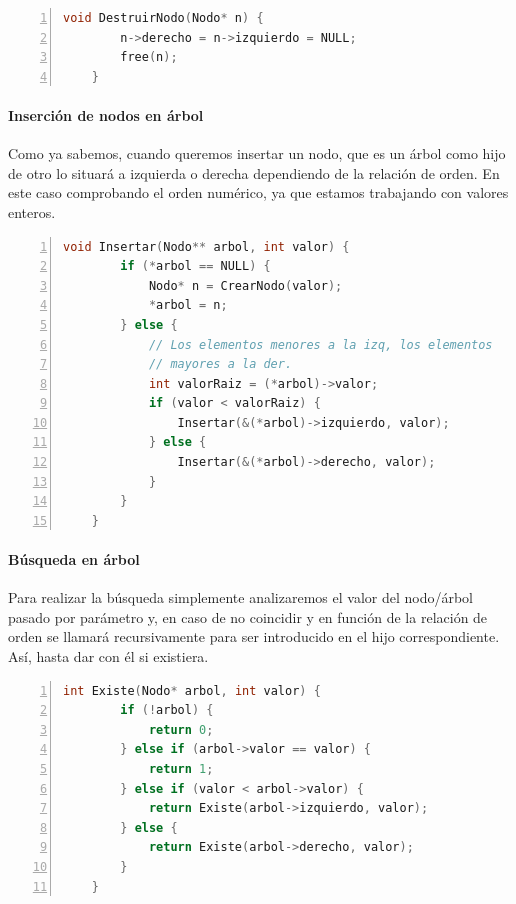 \documentclass[a4paper, 11pt, titlepage]{article}
\begin{document}
            \begin{lstlisting}[language=C,numbers=left]
    void DestruirNodo(Nodo* n) {
        n->derecho = n->izquierdo = NULL;
        free(n);
    }\end{lstlisting}

            \paragraph{Inserción de nodos en árbol} Como ya sabemos, cuando queremos insertar 
            un nodo, que es un árbol como hijo de otro lo situará a izquierda o derecha 
            dependiendo de la relación de orden. En este caso comprobando el orden numérico, 
            ya que estamos trabajando con valores enteros.
            
            \begin{lstlisting}[language=C,numbers=left]
    void Insertar(Nodo** arbol, int valor) {
        if (*arbol == NULL) {
            Nodo* n = CrearNodo(valor);
            *arbol = n;
        } else {
            // Los elementos menores a la izq, los elementos
            // mayores a la der.
            int valorRaiz = (*arbol)->valor;
            if (valor < valorRaiz) {
                Insertar(&(*arbol)->izquierdo, valor);
            } else {
                Insertar(&(*arbol)->derecho, valor);
            }
        }
    }\end{lstlisting}

            \paragraph{Búsqueda en árbol} Para realizar la búsqueda simplemente analizaremos 
            el valor del nodo/árbol pasado por parámetro y, en caso de no coincidir y en 
            función de la relación de orden se llamará recursivamente para ser introducido en 
            el hijo correspondiente. Así, hasta dar con él si existiera.

            \begin{lstlisting}[language=C,numbers=left]
    int Existe(Nodo* arbol, int valor) {
        if (!arbol) {
            return 0;
        } else if (arbol->valor == valor) {
            return 1;
        } else if (valor < arbol->valor) {
            return Existe(arbol->izquierdo, valor);
        } else {
            return Existe(arbol->derecho, valor);
        }
    }\end{lstlisting}
\end{document}
